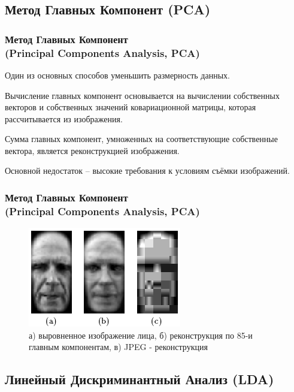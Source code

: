 \documentclass{beamer}
\begin{document}
\subsection{Метод Главных Компонент (PCA)}

\begin{frame}
\frametitle{Метод Главных Компонент\\(Principal Components Analysis, PCA)}

Один из основных способов уменьшить размерность данных.
\bigskip

Вычисление главных компонент основывается на вычислении собственных векторов и собственных значений ковариационной матрицы, которая рассчитывается из изображения. 
\bigskip

Сумма главных компонент, умноженных на соответствующие собственные вектора, является реконструкцией изображения.
\bigskip

Основной недостаток – высокие требования к условиям съёмки изображений.

\end{frame}
\begin{frame}
\frametitle{Метод Главных Компонент\\(Principal Components Analysis, PCA)}

\begin{figure}
\includegraphics[scale=1]{res/img04}
\caption{а) выровненное изображение лица, б) реконструкция по 85-и главным компонентам, в) JPEG - реконструкция}
\end{figure}

\end{frame}

\subsection{Линейный Дискриминантный Анализ (LDA)}
\end{document}
